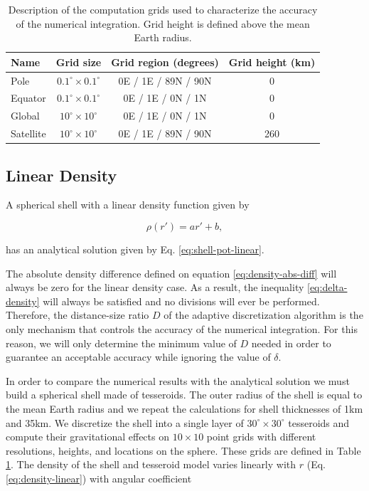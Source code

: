 \documentclass[extra, referee]{gji}
\begin{document}
\begin{table}
\caption{
    Description of the computation grids used to characterize the accuracy of the
    numerical integration.
    Grid height is defined above the mean Earth radius.
}
\label{tab:grids}
\begin{tabular}{lccc}
    Name & Grid size & Grid region (degrees) & Grid height (km)
    \\ \hline
    Pole      & $0.1^\circ \times 0.1^\circ$ & 0E / 1E / 89N / 90N  & 0   \\
    Equator   & $0.1^\circ \times 0.1^\circ$ & 0E / 1E / 0N  / 1N   & 0   \\
    Global    & $ 10^\circ \times  10^\circ$ & 0E / 1E / 0N  / 1N   & 0   \\
    Satellite & $ 10^\circ \times  10^\circ$ & 0E / 1E / 89N / 90N  & 260 \\
\end{tabular}
\end{table}


\subsection{Linear Density}

A spherical shell with a linear density function given by

\begin{equation}
    \rho(r') = ar' + b,
    \label{eq:density-linear}
\end{equation}

\noindent
has an analytical solution given by Eq. \ref{eq:shell-pot-linear}.

The absolute density difference defined on equation
\ref{eq:density-abs-diff} will always be zero for the linear density case.
As a result, the inequality \ref{eq:delta-density} will always be satisfied and no
divisions will ever be performed.
Therefore, the distance-size ratio $D$ of the adaptive discretization algorithm is the
only mechanism that controls the accuracy of the numerical integration.
For this reason, we will only determine the minimum value of $D$ needed in order to
guarantee an acceptable accuracy while ignoring the value of $\delta$.

In order to compare the numerical results with the analytical solution we
must build a spherical shell made of tesseroids.
The outer radius of the shell is equal to the mean Earth radius and we repeat the
calculations for shell thicknesses of 1km and 35km.
We discretize the shell into a single layer of $30^\circ \times 30^\circ$ tesseroids and
compute their gravitational effects on $10 \times 10$ point grids with different
resolutions, heights, and locations on the sphere.
These grids are defined in Table \ref{tab:grids}.
The density of the shell and tesseroid model varies linearly with $r$
(Eq. \ref{eq:density-linear}) with angular coefficient
\end{document}
